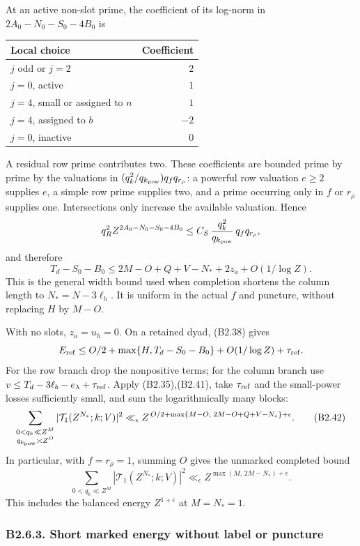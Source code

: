 \documentclass[11pt,a4paper]{article}
\begin{document}
At an active non-slot prime, the coefficient of its log-norm in
\(2A_0-N_0-S_0-4B_0\) is

\begin{longtable}[]{@{}lr@{}}
\toprule\noalign{}
Local choice & Coefficient \\
\midrule\noalign{}
\endhead
\bottomrule\noalign{}
\endlastfoot
\(j\) odd or \(j=2\) & \(2\) \\
\(j=0\), active & \(1\) \\
\(j=4\), small or assigned to \(n\) & \(1\) \\
\(j=4\), assigned to \(b\) & \(-2\) \\
\(j=0\), inactive & \(0\) \\
\end{longtable}

A residual row prime contributes two. These coefficients are bounded
prime by prime by the valuations in
\((q_k^2/q_{k_{\rm pow}})q_fq_{r_\rho}\): a powerful row valuation
\(e\ge2\) supplies \(e\), a simple row prime supplies two, and a prime
occurring only in \(f\) or \(r_\rho\) supplies one. Intersections only
increase the available valuation. Hence \[
q_R^2 Z^{2A_0-N_0-S_0-4B_0}
\le C_S\,\frac{q_k^2}{q_{k_{\rm pow}}}\,q_fq_{r_\rho},
\] and therefore \[
T_d-S_0-B_0
\le2M-O+Q+V-N_*+2z_a+O(1/\log Z).
\tag{B2.41}
\] This is the general width bound used when completion shortens the
column length to \(N_*=N-3\ell_h\). It is uniform in the actual \(f\)
and puncture, without replacing \(H\) by \(M-O\).

With no slots, \(z_a=u_h=0\). On a retained dyad, (B2.38) gives \[
E_{\rm ref}\le O/2+\max\{H,T_d-S_0-B_0\}
+O(1/\log Z)+\tau_{\rm ref}.
\] For the row branch drop the nonpositive terms; for the column branch
use \(v\le T_d-3\ell_b-e_\lambda+\tau_{\rm ref}\). Apply
(B2.35),(B2.41), take \(\tau_{\rm ref}\) and the small-power losses
sufficiently small, and sum the logarithmically many blocks: \[
\sum_{\substack{0<q_k\ll Z^M\\q_{k_{\rm pow}}\asymp Z^O}}
|\mathcal T_1(Z^{N_*};k;V)|^2
\ll_\epsilon
Z^{\,O/2+\max\{M-O,\;2M-O+Q+V-N_*\}+\epsilon}.
\tag{B2.42}
\] In particular, with \(f=r_\rho=1\), summing \(O\) gives the unmarked
completed bound \[
\sum_{0<q_k\ll Z^M}|\mathcal T_1(Z^{N_*};k;V)|^2
\ll_\epsilon Z^{\max(M,\,2M-N_*)+\epsilon}.
\tag{B2.43}
\] This includes the balanced energy \(Z^{1+\epsilon}\) at \(M=N_*=1\).

\hypertarget{b2.6.3.-short-marked-energy-without-label-or-puncture}{%
\subsubsection{B2.6.3. Short marked energy without label or
puncture}\label{b2.6.3.-short-marked-energy-without-label-or-puncture}}
\end{document}
